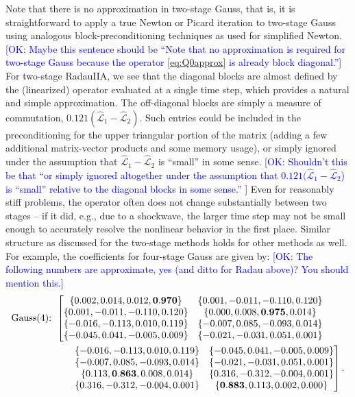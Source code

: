 \documentclass[review]{siamart}
\newcommand{\OK}[1]{\textcolor{blue}{[OK: #1]}}
\begin{document}
Note that there is no approximation in two-stage Gauss, that is, it is
straightforward to apply a true Newton or Picard iteration to two-stage Gauss
using analogous block-preconditioning techniques as used for simplified Newton.
%
\OK{Maybe this sentence should be ``Note that no approximation is required for two-stage Gauss because the operator \eqref{eq:Q0approx} is already block diagonal.''}
%
For two-stage RadauIIA, we see that the diagonal blocks are almost
defined by the (linearized) operator evaluated at a single time step, which
provides a natural and simple approximation. The off-diagonal blocks are
simply a measure of commutation, $0.121(\widehat{\mathcal{L}}_1 - \widehat{\mathcal{L}}_2)$.
Such entries could be included in the preconditioning for the upper
triangular portion of the matrix (adding a few additional matrix-vector products and some memory usage), or simply ignored under the assumption that $\widehat{\mathcal{L}}_1 -
\widehat{\mathcal{L}}_2$ is ``small'' in some sense. 
%
\OK{
Shouldn't this be that ``or simply ignored altogether under the assumption that $0.121(\widehat{\mathcal{L}}_1 -
\widehat{\mathcal{L}}_2$) is ``small'' relative to the diagonal blocks in some sense.''
}
%
Even for reasonably stiff
problems, the operator often does not change substantially between
two stages -- if it did, e.g., due to a shockwave, the larger time step
may not be small enough to accurately resolve the nonlinear behavior in
the first place. Similar structure as discussed for the two-stage methods
holds for other methods as well. For example, the coefficients for four-stage
Gauss are given by: \OK{The following numbers are approximate, yes (and ditto for Radau above)? You should mention this.}
%
\begin{align*}
\textnormal{Gauss(4):}& \hspace{1ex}
\left[\begin{matrix}
\{0.002,0.014,0.012,\mathbf{0.970}\} & \{0.001,-0.011,-0.110,0.120\} \\
\{0.001,-0.011,-0.110,0.120\} & \{0.000,0.008,\mathbf{0.975},0.014\} \\
\{-0.016,-0.113,0.010,0.119\} & \{-0.007,0.085,-0.093,0.014\} \\
\{-0.045,0.041,-0.005,0.009\} & \{-0.021,-0.031,0.051,0.001\}
\end{matrix}\right.
\\&\hspace{5ex}
\left.\begin{matrix}
\{-0.016,-0.113,0.010,0.119\} & \{-0.045,0.041,-0.005,0.009\}\\
\{-0.007,0.085,-0.093,0.014\} & \{-0.021,-0.031,0.051,0.001\}\\
\{0.113,\mathbf{0.863},0.008,0.014\} & \{0.316,-0.312,-0.004,0.001\}\\
\{0.316,-0.312,-0.004,0.001\} & \{\mathbf{0.883},0.113,0.002,0.000\}\\
\end{matrix}\right].
\end{align*}
\end{document}
